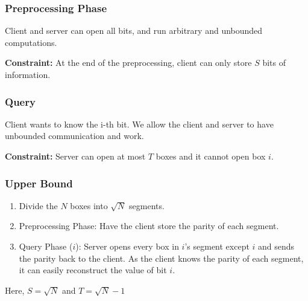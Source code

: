 \subsubsection{Preprocessing Phase}
Client and server can open all bits, and run arbitrary and unbounded computations. 

\textbf{Constraint:} At the end of the preprocessing, client can only store $S$ bits of information.

\subsubsection{Query}
Client wants to know the i-th bit. We allow the client and server to have unbounded communication and work.

\textbf{Constraint:} Server can open at most $T$ boxes and it cannot open box $i$.

\subsubsection{Upper Bound}
\begin{enumerate}
    \item Divide the $N$ boxes into $\sqrt{N}$ segments. 
    \item Preprocessing Phase: Have the client store the parity of each segment.
    \item Query Phase ($i$): Server opens every box in $i$'s segment except $i$ and sends the parity back to the client. As the client knows the parity of each segment, it can easily reconstruct the value of bit $i$.
\end{enumerate}
Here, $S = \sqrt{N}$ and $T = \sqrt{N} - 1$

